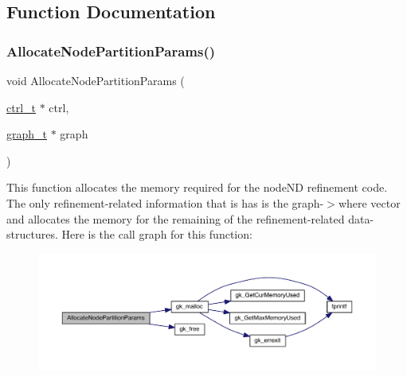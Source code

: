 \subsection{Function Documentation}
\mbox{\label{a00383_a3f8a334ec92f8da97ad3b2aa2e83fda4}} 
\subsubsection{\texorpdfstring{Allocate\+Node\+Partition\+Params()}{AllocateNodePartitionParams()}}
{\footnotesize\ttfamily void Allocate\+Node\+Partition\+Params (\begin{DoxyParamCaption}\item[{\hyperlink{a00742}{ctrl\+\_\+t} $\ast$}]{ctrl,  }\item[{\hyperlink{a00734}{graph\+\_\+t} $\ast$}]{graph }\end{DoxyParamCaption})}

This function allocates the memory required for the node\+ND refinement code. The only refinement-\/related information that is has is the {\ttfamily graph-\/$>$where} vector and allocates the memory for the remaining of the refinement-\/related data-\/structures. Here is the call graph for this function\+:\nopagebreak
\begin{figure}[H]
\begin{center}
\leavevmode
\includegraphics[width=350pt]{a00383_a3f8a334ec92f8da97ad3b2aa2e83fda4_cgraph}
\end{center}
\end{figure}
\mbox{\label{a00383_a2693025c208df9d9f71b7c546a613789}} 
